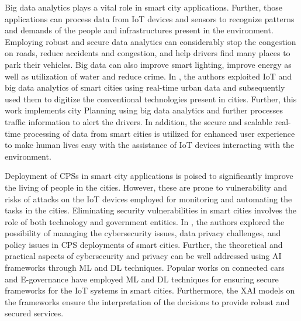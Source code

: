 \documentclass[journal]{IEEEtran}
\begin{document}
Big data analytics plays a vital role in smart city applications. Further, those applications can process data from IoT devices and sensors to recognize patterns and demands of the people and infrastructures present in the environment. Employing robust and secure data analytics can considerably stop the congestion on roads, reduce accidents and congestion, and help drivers find many places to park their vehicles. Big data can also improve smart lighting, improve energy as well as utilization of water and reduce crime. In \cite{rathore2018exploiting}, the authors exploited IoT and big data analytics of smart cities using real-time urban data and subsequently used them to digitize the conventional technologies present in cities. Further, this work \cite{rathore2018exploiting} implements city Planning using big data analytics and further processes traffic information to alert the drivers. In addition, the secure and scalable real-time processing of data from smart cities is utilized for enhanced user experience to make human lives easy with the assistance of IoT devices interacting with the environment.

Deployment of CPSs in smart city applications is poised to significantly improve the living of people in the cities. However, these are prone to vulnerability and risks of attacks on the IoT devices employed for monitoring and automating the tasks in the cities. Eliminating security vulnerabilities in smart cities involves the role of both technology and government entities. In \cite{habibzadeh2019survey}, the authors explored the possibility of managing the cybersecurity issues, data privacy challenges, and policy issues in CPS deployments of smart cities. Further, the theoretical and practical aspects of cybersecurity and privacy can be well addressed using AI frameworks through ML and DL techniques. Popular works on connected cars \cite{olufowobi2019connected} and E-governance \cite{yang2019privacy} have employed ML and DL techniques for ensuring secure frameworks for the IoT systems in smart cities. Furthermore, the XAI models on the frameworks ensure the interpretation of the decisions to provide robust and secured services. 
\end{document}
